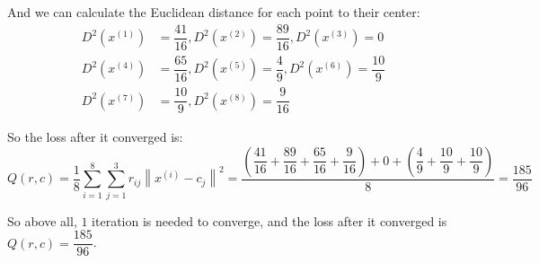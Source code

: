 And we can calculate the Euclidean distance for each point to their center:
\begin{align*}
D^2\left(x^{(1)}\right) &= \dfrac{41}{16}, D^2\left(x^{(2)}\right)=\dfrac{89}{16}, D^2\left(x^{(3)}\right)=0 \\
D^2\left(x^{(4)}\right) &= \dfrac{65}{16}, D^2\left(x^{(5)}\right)=\dfrac{4}{9}, D^2\left(x^{(6)}\right)=\dfrac{10}{9} \\
D^2\left(x^{(7)}\right) &= \dfrac{10}{9}, D^2\left(x^{(8)}\right)=\dfrac{9}{16}
\end{align*}

So the loss after it converged is:
$$Q(r,c)=\dfrac{1}{8}\sum\limits_{i=1}^8\sum\limits_{j=1}^3r_{ij}\left\|x^{(i)}-c_j\right\|^2 = \dfrac{\left(\dfrac{41}{16}+\dfrac{89}{16}+\dfrac{65}{16}+\dfrac{9}{16}\right) + 0 + \left(\dfrac{4}{9}+\dfrac{10}{9}+\dfrac{10}{9}\right)}{8}=\dfrac{185}{96}$$

So above all, $1$ iteration is needed to converge, and the loss after it converged is $Q(r,c)=\dfrac{185}{96}$.

\newpage